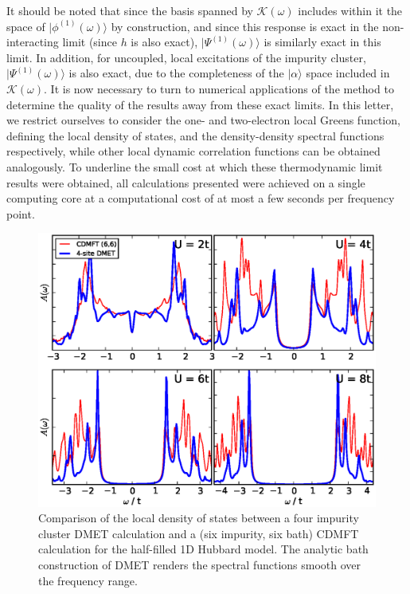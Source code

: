 \documentclass[aps,showpacs,twocolumn,nobibnotes]{revtex4}
\begin{document}
It should be noted that since the basis spanned by $\mathcal{K}(\omega)$ includes within it the space of $|\phi^{(1)}(\omega) \rangle$ by construction, 
and since this response is exact in the non-interacting limit (since $h$ is also exact), $|\Psi^{(1)}(\omega)\rangle$ is similarly exact in this limit.
In addition, for uncoupled, local excitations of the impurity cluster, $|\Psi^{(1)}(\omega)\rangle$ is also exact, due to the completeness of the 
$|\alpha \rangle$ space included in $\mathcal{K}(\omega)$. It is now necessary to turn to numerical applications of the method to determine the
quality of the results away from these exact limits. 
In this letter, we restrict ourselves to consider the one- and two-electron local Greens function,
defining the local density of states, and the density-density spectral functions respectively, while other local dynamic correlation functions can be obtained analogously.
To underline the small cost at which these thermodynamic limit results were obtained, all calculations presented were achieved on a single computing core at a 
computational cost of at most a few seconds per frequency point.

\begin{figure}
\begin{center}
    \vspace{-2mm}
\includegraphics[scale=0.475]{Plots/1D_Spectra/1D_Hub_Spectra.eps}
\end{center}
    \vspace{-8mm}
\caption{Comparison of the local density of states between a four impurity cluster DMET calculation and a
(six impurity, six bath) CDMFT calculation for the half-filled 1D Hubbard model. The analytic bath construction
of DMET renders the spectral functions smooth over the frequency range.}
\label{1D_DOS}
\end{figure}
\end{document}
